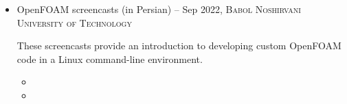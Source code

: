 
\vspace{0.5em}

\begin{itemize}
  \item OpenFOAM screencasts (in Persian) --
    {Sep 2022, \textsc{Babol Noshirvani University of Technology}}\vspace{0.5em}

    \hfill\begin{minipage}{\dimexpr\textwidth-0.92cm}
      These screencasts provide an introduction to developing custom OpenFOAM code in a Linux command-line environment.
    \end{minipage}\vspace{0.5em}

    \begin{itemize}
      \setlength\itemsep{0.3em}
      \item {}
      \item {}
    \end{itemize}
\end{itemize}

